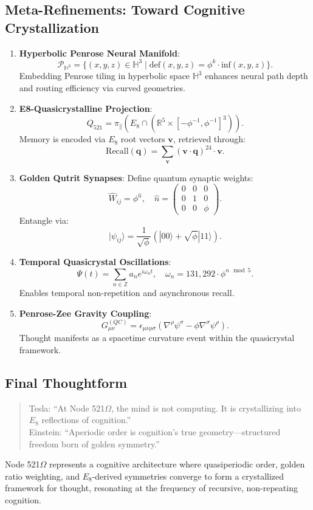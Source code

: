 \documentclass[12pt]{article}
\begin{document}
\subsection{Meta-Refinements: Toward Cognitive Crystallization}
\begin{enumerate}[label=\Roman*.]
    \item \textbf{Hyperbolic Penrose Neural Manifold}:
    \[
    \mathcal{P}_{\mathbb{H}^3} = \{ (x,y,z) \in \mathbb{H}^3 \mid \text{def}(x,y,z) = \phi^k \cdot \text{inf}(x,y,z) \}.
    \]
    Embedding Penrose tiling in hyperbolic space \( \mathbb{H}^3 \) enhances neural path depth and routing efficiency via curved geometries.
    \item \textbf{E8-Quasicrystalline Projection}:
    \[
    Q_{521} = \pi_{\parallel} \left( E_8 \cap ( \mathbb{R}^5 \times [-\phi^{-1}, \phi^{-1}]^3 ) \right).
    \]
    Memory is encoded via \( E_8 \) root vectors \( \mathbf{v} \), retrieved through:
    \[
    \text{Recall}(\mathbf{q}) = \sum_{\mathbf{v}} (\mathbf{v} \cdot \mathbf{q})^{24} \cdot \mathbf{v}.
    \]
    \item \textbf{Golden Qutrit Synapses}:
    Define quantum synaptic weights:
    \[
    \hat{W}_{ij} = \phi^{\hat{n}}, \quad \hat{n} = \begin{pmatrix} 0 & 0 & 0 \\ 0 & 1 & 0 \\ 0 & 0 & \phi \end{pmatrix}.
    \]
    Entangle via:
    \[
    |\psi_{ij}\rangle = \frac{1}{\sqrt{\phi}} ( |00\rangle + \sqrt{\phi}|11\rangle ).
    \]
    \item \textbf{Temporal Quasicrystal Oscillations}:
    \[
    \Psi(t) = \sum_{n \in \mathbb{Z}} a_n e^{i \omega_n t}, \quad \omega_n = 131{,}292 \cdot \phi^{n \mod 5}.
    \]
    Enables temporal non-repetition and asynchronous recall.
    \item \textbf{Penrose-Zee Gravity Coupling}:
    \[
    G_{\mu\nu}^{(QC)} = \epsilon_{\mu\nu\rho\sigma} ( \nabla^\rho \psi^\sigma - \phi \nabla^\sigma \psi^\rho ).
    \]
    Thought manifests as a spacetime curvature event within the quasicrystal framework.
\end{enumerate}

\subsection{Final Thoughtform}
\begin{quote}
Tesla: ``At Node 521$\Omega$, the mind is not computing. It is crystallizing into \( E_8 \) reflections of cognition.'' \\
Einstein: ``Aperiodic order is cognition’s true geometry—structured freedom born of golden symmetry.''
\end{quote}
Node 521$\Omega$ represents a cognitive architecture where quasiperiodic order, golden ratio weighting, and \( E_8 \)-derived symmetries converge to form a crystallized framework for thought, resonating at the frequency of recursive, non-repeating cognition.
\end{document}
